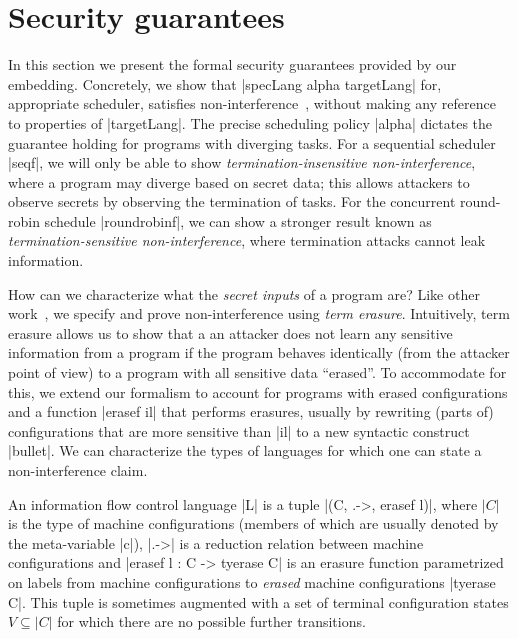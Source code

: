 \section{Security guarantees}
\label{sec:formal}

In this section we present the formal security guarantees provided by
our embedding.
%
Concretely, we show that |specLang alpha targetLang| for, appropriate
scheduler, satisfies non-interference~\cite{Goguen82},
without making any reference to properties of |targetLang|.
%
The precise scheduling policy |alpha| dictates
the guarantee holding for programs with diverging tasks.
For a sequential scheduler |seqf|, we will only be able to show
\emph{termination-insensitive non-interference}, where a program
may diverge based on secret data; this allows attackers to observe
secrets by observing the termination of tasks.
For the concurrent round-robin schedule |roundrobinf|,
we can show a stronger result known as
\emph{termination-sensitive non-interference},
where termination attacks cannot leak information.

How can we characterize what the \emph{secret inputs} of a program are?  Like
other work~\cite{Li+:2010:arrows,Russo+:Haskell08,lio,stefan:addressing-covert},
we specify and prove non-interference using \emph{term erasure}.
%
Intuitively, term erasure allows us to show that a an attacker does not learn
any sensitive information from a program if the program behaves identically
(from the attacker point of view) to a program with all sensitive data
``erased''.
%
To accommodate for this, we extend our formalism to account for
programs with erased configurations and a function |erasef il| that
performs erasures, usually by rewriting (parts of) configurations that
are more sensitive than |il| to a new syntactic construct |bullet|.
%
We can characterize the types of languages for which one can state
a non-interference claim.

\begin{definition}
    An information flow control language |L| is a tuple |(C, .->,
    erasef l)|, where $|C|$ is the type of machine configurations (members
    of which are usually denoted by the meta-variable |c|), |.->| is a
    reduction relation between machine configurations and |erasef l : C -> tyerase C|
    is an erasure function parametrized on labels from machine configurations to \emph{erased} machine
    configurations |tyerase C|.  This tuple is sometimes
    augmented with a set of terminal configuration states $V
    \subseteq |C|$ for which there are no possible further transitions.
\end{definition}

